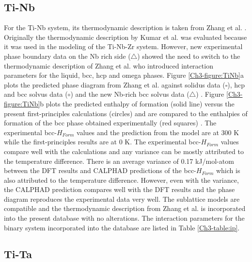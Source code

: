 \subsection{Ti-Nb}

For the Ti-Nb system, its thermodynamic description is taken from Zhang et al. \cite{Zhang2001}. Originally the thermodynamic description by Kumar et al. \cite{Kumar1994,Kumar1994a} was evaluated because it was used in the modeling of the Ti-Nb-Zr system. However, new experimental phase boundary data on the Nb rich side ($\bigtriangleup$) showed the need to switch to the thermodynamic description of Zhang et al. \cite{Zhang2001} who introduced interaction parameters for the liquid, bcc, hcp and omega phases. Figure \ref{Ch3-figure:TiNb}a plots the predicted phase diagram from Zhang et al. \cite{Zhang2001} against solidus data ($\square$), hcp and bcc solvus data ($\circ$) \cite{Kumar1994,Kumar1994a} and the new Nb-rich bcc solvus data ($\bigtriangleup$) \cite{Zhang2001}. Figure \ref{Ch3-figure:TiNb}b plots the predicted enthalpy of formation (solid line) versus the present first-principles calculations (circles) and are compared to the enthalpies of formation of the bcc phase obtained experimentally (red squares) \cite{Uesugi2013}. The experimental bcc-$H_{Form}$ values and the prediction from the model are at 300 K while the first-principles results are at 0 K. The experimental bcc-$H_{Form}$ values compare well with the calculations and any variance can be mostly attributed to the temperature difference. There is an average variance of 0.17 kJ/mol-atom between the DFT results and CALPHAD predictions of the bcc-$H_{Form}$ which is also attributed to the temperature difference. However, even with the variance, the CALPHAD prediction compares well with the DFT results and the phase diagram reproduces the experimental data very well. The sublattice models are compatible and the thermodynamic description from Zhang et al. \cite{Zhang2001} is incorporated into the present database with no alterations. The interaction parameters for the binary system incorporated into the database are listed in Table \ref{Ch3-table:ip}.

\subsection{Ti-Ta}

